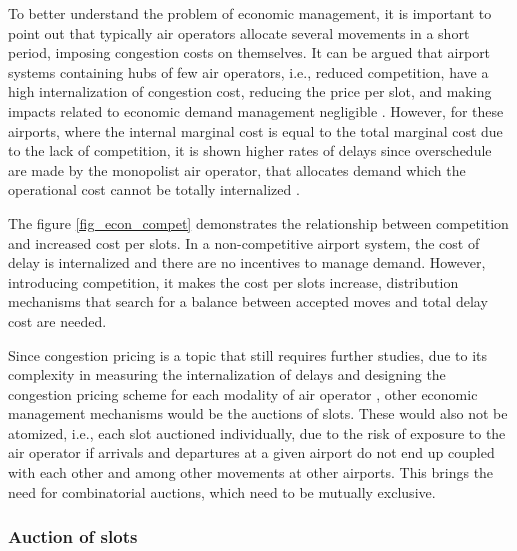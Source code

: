 %

To better understand the problem of economic management, it is important to point out that typically air operators allocate several movements in a short period, imposing congestion costs on themselves. It can be argued that airport systems containing hubs of few air operators, i.e., reduced competition, have a high internalization of congestion cost, reducing the price per slot, and making impacts related to economic demand management negligible \cite{ball2006auctions, gillen2016airport}. However, for these airports, where the internal marginal cost is equal to the total marginal cost due to the lack of competition, it is shown higher rates of delays since overschedule are made by the monopolist air operator, that allocates demand which the operational cost cannot be totally internalized \cite{ball2006auctions}.

The figure \ref{fig_econ_compet} demonstrates the relationship between competition and increased cost per slots. In a non-competitive airport system, the cost of delay is internalized and there are no incentives to manage demand. However, introducing competition, it makes the cost per slots increase, distribution mechanisms that search for a balance between accepted moves and total delay cost are needed.

%

Since congestion pricing is a topic that still requires further studies, due to its complexity in measuring the internalization of delays and designing the congestion pricing scheme for each modality of air operator \cite{gillen2016airport}, other economic management mechanisms would be the auctions of slots. These would also not be atomized, i.e., each slot auctioned individually, due to the risk of exposure to the air operator if arrivals and departures at a given airport do not end up coupled with each other and among other movements at other airports. This brings the need for combinatorial auctions, which need to be mutually exclusive.

\subsubsection{Auction of slots}

